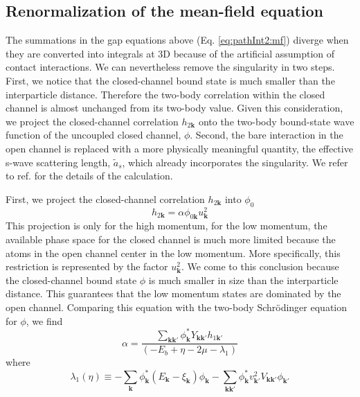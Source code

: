 \documentclass[reprint,pra]{revtex4-1}
\newcommand{\vk}{\ensuremath{\mathbf{k}}}
\providecommand{\sch}{{Schr\"{o}dinger }}
\newcommand{\br}[1]{\ensuremath{\left(#1\right)}}
\begin{document}
 
 \subsection{Renormalization of the mean-field equation}
    The summations in the gap equations above (Eq. \ref{eq:pathInt2:mf}) diverge when they are converted into integrals at 3D because of the artificial assumption of contact interactions. 
We can nevertheless remove the singularity in two steps.  First, we notice that the closed-channel bound state is much smaller than the interparticle distance. Therefore the two-body correlation within the closed channel is almost unchanged from its two-body value.  Given this consideration, we project the closed-channel correlation $h_{2\vk}$  onto the two-body  bound-state wave function of the uncoupled closed channel, $\phi$.  Second, the bare interaction in the open channel is replaced with a more physically meaningful quantity, the effective s-wave scattering length, $\tilde{a}_s$, which already incorporates the singularity. We refer to ref. \cite{Zhuthesis} for the details of the calculation.  
 
 First, we project the closed-channel correlation $h_{2\vk}$ into  $\phi_{0}$
\begin{equation}\label{eq:pathInt2:hphi}
h_{2\vk}=\alpha\phi^{}_{0\vk}u_{\vk}^{2}
\end{equation}
This projection is only for the high momentum, for the low momentum, the available phase space for the closed channel is much more limited because the atoms in the open channel center in the low momentum.  More specifically, this restriction is represented by the factor $u_{\vk}^2$.  We come to this conclusion because the closed-channel bound state $\phi$ is much smaller in size than the interparticle distance.  This guarantees that the low momentum states are dominated by the open channel.  
Comparing this equation with the two-body \sch equation for $\phi$, we find
\begin{equation}\label{eq:pathInt2:alpha}
\alpha=\frac{\sum_{\vk\vk'}{\phi_{\vk}^{*}}{Y_{\vk\vk'}}{h_{1\vk'}}}{\br{-E_{b}+\eta-2\mu-\lambda_{1}}}
\end{equation}
where
\begin{equation}\label{eq:pathInt2:lambda1}
\lambda_{1}(\eta)\equiv-\sum_{\vk}{\phi_{\vk}^{*}}{(E_{\vk}-\xi_{\vk})}\phi_{\vk}
	-\sum_{\vk\vk'}{\phi_{\vk}^{*}}{v_{\vk'}^{2}V_{\vk\vk'}}\phi_{\vk'}
\end{equation}
\end{document}
